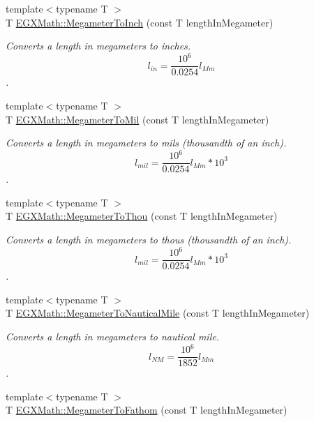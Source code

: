 \begin{DoxyCompactItemize}
{\footnotesize template$<$typename T $>$ }\\T \mbox{\hyperlink{group___e_g_x_math-_conversions-_length_conversions-_s_i-_megameter-_imperial_ga21eaef4c8ebcc2982ac3a212dc462a95}{E\+G\+X\+Math\+::\+Megameter\+To\+Inch}} (const T length\+In\+Megameter)
\begin{DoxyCompactList}\small\item\em Converts a length in megameters to inches. \[ l_{in}= \frac{10^{6}}{0.0254} l_{Mm} \]. \end{DoxyCompactList}\item 
{\footnotesize template$<$typename T $>$ }\\T \mbox{\hyperlink{group___e_g_x_math-_conversions-_length_conversions-_s_i-_megameter-_imperial_ga9494edd6659b7f69549d4fe96b9e2f98}{E\+G\+X\+Math\+::\+Megameter\+To\+Mil}} (const T length\+In\+Megameter)
\begin{DoxyCompactList}\small\item\em Converts a length in megameters to mils (thousandth of an inch). \[ l_{mil}= \frac{10^{6}}{0.0254} l_{Mm} * 10^{3} \]. \end{DoxyCompactList}\item 
{\footnotesize template$<$typename T $>$ }\\T \mbox{\hyperlink{group___e_g_x_math-_conversions-_length_conversions-_s_i-_megameter-_imperial_gae791a30b052a322fff88090e90fe32b5}{E\+G\+X\+Math\+::\+Megameter\+To\+Thou}} (const T length\+In\+Megameter)
\begin{DoxyCompactList}\small\item\em Converts a length in megameters to thous (thousandth of an inch). \[ l_{mil}= \frac{10^{6}}{0.0254} l_{Mm} * 10^{3} \]. \end{DoxyCompactList}\item 
{\footnotesize template$<$typename T $>$ }\\T \mbox{\hyperlink{group___e_g_x_math-_conversions-_length_conversions-_s_i-_megameter-_nautical_ga483b575b1654e1d0f6ea1fac63b5f54e}{E\+G\+X\+Math\+::\+Megameter\+To\+Nautical\+Mile}} (const T length\+In\+Megameter)
\begin{DoxyCompactList}\small\item\em Converts a length in megameters to nautical mile. \[ l_{NM}= \frac{10^{6}}{1852} l_{Mm} \]. \end{DoxyCompactList}\item 
{\footnotesize template$<$typename T $>$ }\\T \mbox{\hyperlink{group___e_g_x_math-_conversions-_length_conversions-_s_i-_megameter-_nautical_ga7149d3c252ab9459f8caad7b054f0601}{E\+G\+X\+Math\+::\+Megameter\+To\+Fathom}} (const T length\+In\+Megameter)

\end{DoxyCompactItemize}
